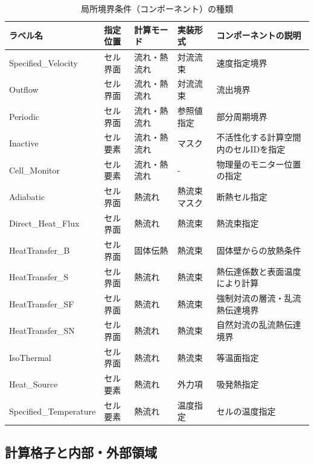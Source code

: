 \begin{table}[htdp]
\caption{局所境界条件（コンポーネント）の種類}
\begin{center}
\small
\begin{tabular}{lllll} \toprule
ラベル名 & 指定位置 & 計算モード & 実装形式 & コンポーネントの説明\\ \midrule
Specified\_Velocity & セル界面 & 流れ・熱流れ & 対流流束 & 速度指定境界\\
Outflow & セル界面 & 流れ・熱流れ & 対流流束 & 流出境界\\
Periodic & セル界面 & 流れ・熱流れ & 参照値指定 & 部分周期境界\\
Inactive & セル要素 & 流れ・熱流れ & マスク & 不活性化する計算空間内のセルIDを指定\\
Cell\_Monitor & セル要素 & 流れ・熱流れ & - & 物理量のモニター位置の指定\\ 
Adiabatic & セル界面 & 熱流れ & 熱流束マスク & 断熱セル指定\\
Direct\_Heat\_Flux & セル界面 & 熱流れ & 熱流束 & 熱流束指定\\
HeatTransfer\_B & セル界面 & 固体伝熱 & 熱流束 & 固体壁からの放熱条件\\
HeatTransfer\_S & セル界面 & 熱流れ & 熱流束 & 熱伝達係数と表面温度により計算\\
HeatTransfer\_SF & セル界面 & 熱流れ & 熱流束 & 強制対流の層流・乱流熱伝達境界\\
HeatTransfer\_SN & セル界面 & 熱流れ & 熱流束 & 自然対流の乱流熱伝達境界\\
IsoThermal & セル界面 & 熱流れ & 熱流束 & 等温面指定\\
Heat\_Source & セル要素 & 熱流れ & 外力項 & 吸発熱指定\\
Specified\_Temperature & セル要素 & 熱流れ & 温度指定 & セルの温度指定\\
\bottomrule
\end{tabular}
\end{center}
\label{tbl:tag_ibc}
\end{table}


%
\pagebreak
\subsection{計算格子と内部・外部領域}

